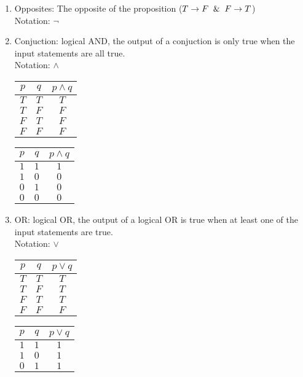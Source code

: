 \documentclass{article}
\begin{document}
\begin{enumerate}[label=Def. \arabic*:, leftmargin=3.5em, align=left]
  \item Opposites: The opposite of the proposition ($T \rightarrow F \And F \rightarrow T$)\\Notation: $\neg$
  \item Conjuction: logical AND, the output of a conjuction is only true when the input statements are all true.\\
  Notation: $\wedge$
  \vspace{.25cm}\\
  \begin{tabular}{cc|c}
    $p$ & $q$ & $p \wedge q$ \\ \hline 
    $T$ & $T$ & $T$ \\
    $T$ & $F$ & $F$ \\
    $F$ & $T$ & $F$ \\
    $F$ & $F$ & $F$ \\
  \end{tabular} \qquad
  \begin{tabular}{cc|c}
    $p$ & $q$ & $p \wedge q$ \\ \hline 
    $1$ & $1$ & $1$ \\
    $1$ & $0$ & $0$ \\
    $0$ & $1$ & $0$ \\
    $0$ & $0$ & $0$ \\
  \end{tabular}
  \item OR: logical OR, the output of a logical OR is true when at least one of the input statements are true.\\
  Notation: $\vee$
  \vspace{.25cm}\\
  \begin{tabular}{cc|c}
    $p$ & $q$ & $p \vee q$ \\ \hline 
    $T$ & $T$ & $T$ \\
    $T$ & $F$ & $T$ \\
    $F$ & $T$ & $T$ \\
    $F$ & $F$ & $F$ \\
  \end{tabular} \qquad
  \begin{tabular}{cc|c}
    $p$ & $q$ & $p \vee q$ \\ \hline 
    $1$ & $1$ & $1$ \\
    $1$ & $0$ & $1$ \\
    $0$ & $1$ & $1$ \\

\end{tabular}
\end{enumerate}
\end{document}
